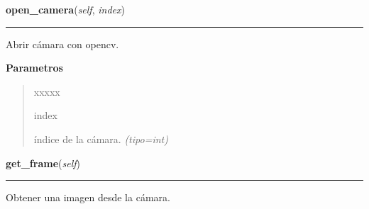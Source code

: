 \hspace{.8\funcindent}\begin{boxedminipage}{\funcwidth}

    \raggedright \textbf{open\_camera}(\textit{self}, \textit{index})

    \vspace{-1.5ex}

    \rule{\textwidth}{0.5\fboxrule}
\setlength{\parskip}{2ex}
Abrir cámara con opencv.

\setlength{\parskip}{1ex}
      \textbf{Parametros}
      \vspace{-1ex}

      \begin{quote}
        \begin{Ventry}{xxxxx}

          \item[index]


índice de la cámara.
            {\it (tipo=int)}

        \end{Ventry}

      \end{quote}

    \end{boxedminipage}

    \label{src:camera:Camera:get_frame}

    \vspace{0.5ex}

\hspace{.8\funcindent}\begin{boxedminipage}{\funcwidth}

    \raggedright \textbf{get\_frame}(\textit{self})

    \vspace{-1.5ex}

    \rule{\textwidth}{0.5\fboxrule}
\setlength{\parskip}{2ex}

Obtener una imagen desde la cámara.
\setlength{\parskip}{1ex}
    \end{boxedminipage}

    \label{src:camera:Camera:is_open}

    \vspace{0.5ex}

